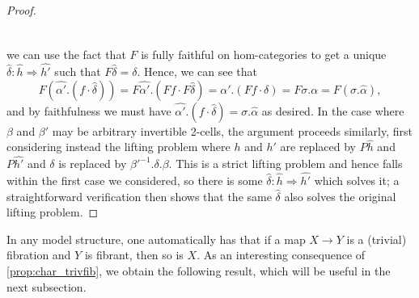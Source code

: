 \documentclass[11pt, dvipsnames]{amsart}
\begin{document}
\begin{proof}
\[\begin{tikzcd}[ampersand replacement=\&,
      column sep=14pt,
    row sep=2.6ex]
    \end{tikzcd}\]
			we can use the fact that $F$ is fully faithful on hom-categories to get a unique $\widehat{\delta}\colon\widehat{h}\Rightarrow \widehat{h'}$ such that $F\widehat{\delta}=\delta$. Hence, we can see that
			\[F(\widehat{\alpha'}.(f \cdot \widehat{\delta})) = F\widehat{\alpha'}.(Ff \cdot F\widehat{\delta})=\alpha'.(Ff\cdot \delta) = F\sigma.\alpha=F(\sigma.\widehat{\alpha}),\] and by faithfulness we must have $\widehat{\alpha'}.(f \cdot \widehat{\delta}) = \sigma.\widehat{\alpha}$ as desired. In the case where $\beta$ and $\beta'$ may be arbitrary invertible 2-cells, the argument proceeds similarly, first considering instead the lifting problem where $h$ and $h'$ are replaced by $P\widehat{h}$ and $P\widehat{h'}$ and $\delta$ is replaced by $\beta'^{-1}.\delta.\beta$. This is a strict lifting problem and hence falls within the first case we considered, so there is some $\widehat{\delta}\colon \widehat{h}\Rightarrow \widehat{h'}$ which solves it; a straightforward verification then shows that the same $\widehat{\delta}$ also solves the original lifting problem.
		\end{proof}

        In any model structure, one automatically has that if a map $X\to Y$ is a (trivial) fibration and $Y$ is fibrant, then so is $X$. As an interesting consequence of \cref{prop:char_trivfib}, we obtain the following result, which will be useful in the next subsection.
\end{document}
